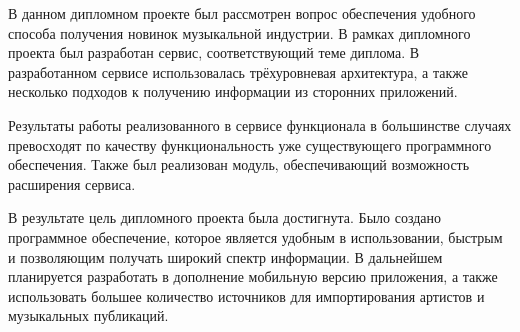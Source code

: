 
В данном дипломном проекте был рассмотрен вопрос обеспечения удобного способа получения новинок музыкальной индустрии.
В рамках дипломного проекта был разработан сервис, соответствующий теме диплома.
В разработанном сервисе использовалась трёхуровневая архитектура, а также несколько подходов к получению информации из сторонних приложений.

Результаты работы реализованного в сервисе функционала в большинстве случаях превосходят по качеству функциональность уже существующего программного обеспечения.
Также был реализован модуль, обеспечивающий возможность расширения сервиса.

В результате цель дипломного проекта была достигнута.
Было создано программное обеспечение, которое является удобным в использовании, быстрым и позволяющим получать широкий спектр информации.
В дальнейшем планируется разработать в дополнение мобильную версию приложения, а также использовать большее количество источников для импортирования артистов и музыкальных публикаций.
